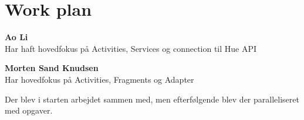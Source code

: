 		\section{Work plan}
		\textbf{Ao Li} \\
		Har haft hovedfokus på Activities, Services og connection til Hue API
		
		\textbf{Morten Sand Knudsen} \\
		Har hovedfokus på Activities, Fragments og Adapter 
		
		Der blev i starten arbejdet sammen med, men efterfølgende blev der paralleliseret med opgaver. 
		
	